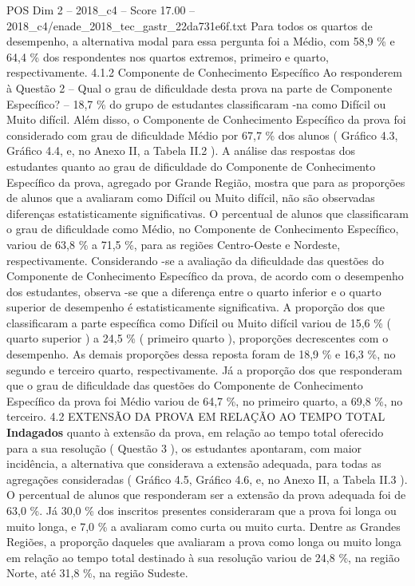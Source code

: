 \begin{textsample}{POS Dim 2 – 2018\_c4 – Score 17.00 – 2018\_c4/enade\_2018\_tec\_gastr\_22da731e6f.txt}
Para todos os quartos de desempenho, a alternativa modal para essa pergunta foi a Médio, com 58,9 \% e 64,4 \% dos respondentes nos quartos extremos, primeiro e quarto, respectivamente. 4.1.2 Componente de Conhecimento Específico Ao responderem à Questão 2 – Qual o grau de dificuldade desta prova na parte de Componente Específico? – 18,7 \% do grupo de estudantes classificaram -na como Difícil ou Muito difícil.
Além disso, o Componente de Conhecimento Específico da prova foi considerado com grau de dificuldade Médio por 67,7 \% dos alunos ( Gráfico 4.3, Gráfico 4.4, e, no Anexo II, a Tabela II.2 ).
A análise das respostas dos estudantes quanto ao grau de dificuldade do Componente de Conhecimento Específico da prova, agregado por Grande Região, mostra que para as proporções de alunos que a avaliaram como Difícil ou Muito difícil, não são observadas diferenças estatisticamente significativas.
O percentual de alunos que classificaram o grau de dificuldade como Médio, no Componente de Conhecimento Específico, variou de 63,8 \% a 71,5 \%, para as regiões Centro-Oeste e Nordeste, respectivamente.
Considerando -se a avaliação da dificuldade das questões do Componente de Conhecimento Específico da prova, de acordo com o desempenho dos estudantes, observa -se que a diferença entre o quarto inferior e o quarto superior de desempenho é estatisticamente significativa.
A proporção dos que classificaram a parte específica como Difícil ou Muito difícil variou de 15,6 \% ( quarto superior ) a 24,5 \% ( primeiro quarto ), proporções decrescentes com o desempenho.
As demais proporções dessa reposta foram de 18,9 \% e 16,3 \%, no segundo e terceiro quarto, respectivamente.
Já a proporção dos que responderam que o grau de dificuldade das questões do Componente de Conhecimento Específico da prova foi Médio variou de 64,7 \%, no primeiro quarto, a 69,8 \%, no terceiro. 4.2 EXTENSÃO DA PROVA EM RELAÇÃO AO TEMPO TOTAL \textbf{Indagados} quanto à extensão da prova, em relação ao tempo total oferecido para a sua resolução ( Questão 3 ), os estudantes apontaram, com maior incidência, a alternativa que considerava a extensão adequada, para todas as agregações consideradas ( Gráfico 4.5, Gráfico 4.6, e, no Anexo II, a Tabela II.3 ).
O percentual de alunos que responderam ser a extensão da prova adequada foi de 63,0 \%.
Já 30,0 \% dos inscritos presentes consideraram que a prova foi longa ou muito longa, e 7,0 \% a avaliaram como curta ou muito curta.
Dentre as Grandes Regiões, a proporção daqueles que avaliaram a prova como longa ou muito longa em relação ao tempo total destinado à sua resolução variou de 24,8 \%, na região Norte, até 31,8 \%, na região Sudeste.

\end{textsample}
